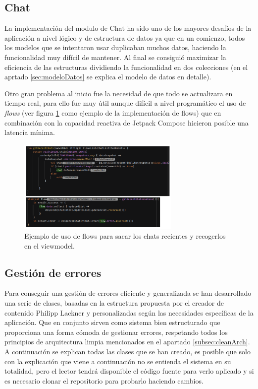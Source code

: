 \subsection{Chat} 
La implementación del modulo de Chat ha sido uno de los mayores desafíos de la aplicación a nivel lógico y de estructura de datos ya que en un comienzo, todos los modelos que se intentaron usar duplicaban muchos datos, haciendo la funcionalidad muy difícil de mantener. Al final se consiguió maximizar la eficiencia de las estructuras dividiendo la funcionalidad en dos colecciones (en el aprtado \ref{sec:modeloDatos} se explica el modelo de datos en detalle). 

Otro gran problema al inicio fue la necesidad de que todo se actualizara en tiempo real, para ello fue muy útil aunque difícil a nivel programático el uso de \textit{flows} (ver figura \ref{fig:flows_impl} como ejemplo de la implementación de flows) que en combinación con la capacidad reactiva de Jetpack Compose hicieron posible una latencia mínima.
\begin{figure}[h]
    \centering
    \includegraphics[width = 0.7\textwidth]{Imagenes/Fuentes/flows_impl.png}
    \caption{Ejemplo de uso de flows para sacar los chats recientes y recogerlos en el viewmodel.}
    \label{fig:flows_impl}
\end{figure}

\subsection{Gestión de errores} 
Para conseguir una gestión de errores eficiente y generalizada se han desarrollado una serie de clases, basadas en la estructura propuesta por el creador de contenido Philipp Lackner\hyperlink{cap:biblio}{} y personalizadas según las necesidades específicas de la aplicación. Que en conjunto sirven como sistema bien estructurado que proporciona una forma cómoda de gestionar errores, respetando todos los principios de arquitectura limpia mencionados en el apartado \ref{subsec:cleanArch}. A continuación se explican todas las clases que se han creado, es posible que solo con la explicación que viene a continuación no se entienda el sistema en su totalidad, pero el lector tendrá disponible el código fuente para verlo aplicado y si es necesario clonar el repositorio para probarlo haciendo cambios.

